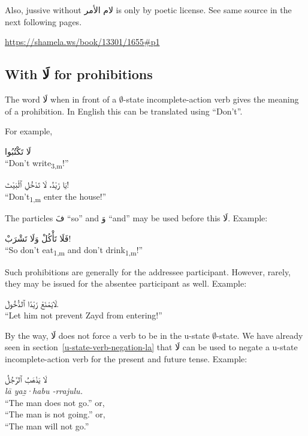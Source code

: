 \documentclass[
  10pt,
]{book}
\begin{document}
Also, jussive without \foreignlanguage{arabic}{لام الأمر} is only by poetic license. See same source in the next following pages.

\url{https://shamela.ws/book/13301/1655\#p1}

\subsection{\texorpdfstring{With \foreignlanguage{arabic}{لَا} for prohibitions}{With لَا for prohibitions}}\label{la-of-prohibition}

The word \foreignlanguage{arabic}{لَا} when in front of a
\(\emptyset\)-state
incomplete-action verb
gives the meaning of a prohibition.
In English this can be translated using \enquote{Don't}.

For example,

\foreignlanguage{arabic}{لَا تَکْتُبُوا}\\
\enquote{Don't write\textsubscript{3,m}!}

\foreignlanguage{arabic}{يَا زَيْدُ، لَا تَدْخُلِ ٱلْبَيْتَ!}\\
\enquote{Don't\textsubscript{1,m} enter the house!}

The particles \foreignlanguage{arabic}{فَ} \enquote{so} and \foreignlanguage{arabic}{وَ} \enquote{and} may be used before this \foreignlanguage{arabic}{لَا}.
Example:

\foreignlanguage{arabic}{فَلَا تَأْکُلْ وَلَا تَشْرَبْ!}\\
\enquote{So don't eat\textsubscript{1,m} and don't drink\textsubscript{1,m}!}

Such prohibitions are generally for the addressee participant.
However, rarely, they may be issued for the absentee participant as well. Example:

\foreignlanguage{arabic}{لَايَمْنَعْ زَيْدًا ٱلدُّخُولَ.}\\
\enquote{Let him not prevent Zayd from entering!}

By the way, \foreignlanguage{arabic}{لَا} does not force a verb to be in the u-state
\(\emptyset\)-state. We have already seen in
section~\ref{u-state-verb-negation-la}
that \foreignlanguage{arabic}{لَا} can be used to negate a u-state incomplete-action verb for the present and future tense.
Example:

\foreignlanguage{arabic}{لَا يَذْهَبُ ٱلرَّجُلُ}\\
\emph{lā yaẕ·habu -rrajulu.}\\
\enquote{The man does not go.} or,\\
\enquote{The man is not going.} or,\\
\enquote{The man will not go.}
\end{document}
